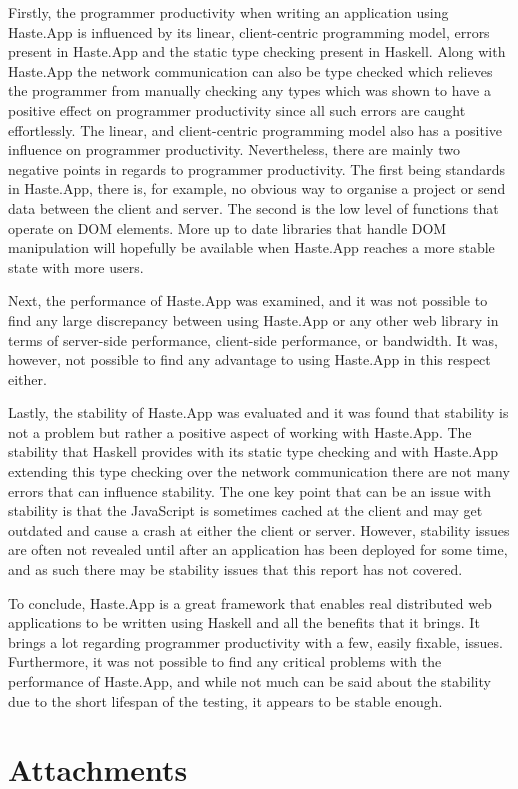 \documentclass[a4paper]{article}
\begin{document}
Firstly, the programmer productivity when writing an application using Haste.App is influenced by its linear, client-centric programming model, errors present in Haste.App and the static type checking present in Haskell. Along with Haste.App the network communication can also be type checked which relieves the programmer from manually checking any types which was shown to have a positive effect on programmer productivity since all such errors are caught effortlessly. The linear, and client-centric programming model also has a positive influence on programmer productivity. Nevertheless, there are mainly two negative points in regards to programmer productivity. The first being standards in Haste.App, there is, for example, no obvious way to organise a project or send data between the client and server. The second is the low level of functions that operate on DOM elements. More up to date libraries that handle DOM manipulation will hopefully be available when Haste.App reaches a more stable state with more users.

Next, the performance of Haste.App was examined, and it was not possible to find any large discrepancy between using Haste.App or any other web library in terms of server-side performance, client-side performance, or bandwidth. It was, however, not possible to find any advantage to using Haste.App in this respect either.

Lastly, the stability of Haste.App was evaluated and it was found that stability is not a problem but rather a positive aspect of working with Haste.App. The stability that Haskell provides with its static type checking and with Haste.App extending this type checking over the network communication there are not many errors that can influence stability. The one key point that can be an issue with stability is that the JavaScript is sometimes cached at the client and may get outdated and cause a crash at either the client or server. However, stability issues are often not revealed until after an application has been deployed for some time, and as such there may be stability issues that this report has not covered.

To conclude, Haste.App is a great framework that enables real distributed web applications to be written using Haskell and all the benefits that it brings. It brings a lot regarding programmer productivity with a few, easily fixable, issues. Furthermore, it was not possible to find any critical problems with the performance of Haste.App, and while not much can be said about the stability due to the short lifespan of the testing, it appears to be stable enough.

\newpage
{}
\printbibliography

\newpage
\section{Attachments}

\end{document}
